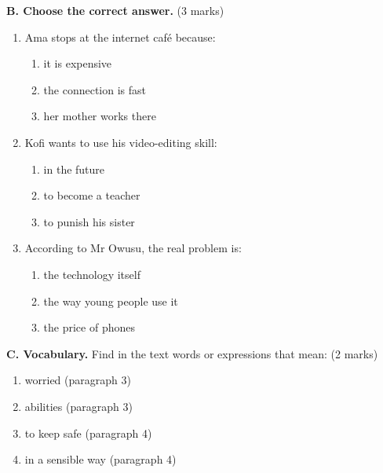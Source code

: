 \documentclass[11pt]{article}
\begin{document}
\begin{exercice}
\textbf{B. Choose the correct answer.} (3 marks)
\begin{enumerate}
\item Ama stops at the internet café because:
\begin{enumerate}
\item it is expensive \item the connection is fast \item her mother works there
\end{enumerate}
\item Kofi wants to use his video-editing skill:
\begin{enumerate}
\item in the future \item to become a teacher \item to punish his sister
\end{enumerate}
\item According to Mr Owusu, the real problem is:
\begin{enumerate}
\item the technology itself \item the way young people use it \item the price of phones
\end{enumerate}
\end{enumerate}

\textbf{C. Vocabulary.} Find in the text words or expressions that mean: (2 marks)
\begin{enumerate}
\item worried (paragraph 3)
\item abilities (paragraph 3)
\item to keep safe (paragraph 4)
\item in a sensible way (paragraph 4)
\end{enumerate}
\end{exercice}
\end{document}
